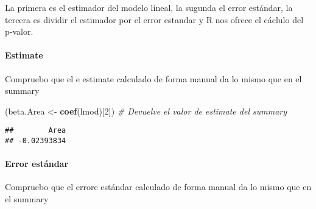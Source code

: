\documentclass[
]{article}
\newenvironment{Shaded}{\begin{snugshade}}{\end{snugshade}}
\newcommand{\CommentTok}[1]{\textcolor[rgb]{0.56,0.35,0.01}{\textit{#1}}}
\newcommand{\DecValTok}[1]{\textcolor[rgb]{0.00,0.00,0.81}{#1}}
\newcommand{\FunctionTok}[1]{\textcolor[rgb]{0.13,0.29,0.53}{\textbf{#1}}}
\newcommand{\NormalTok}[1]{#1}
\newcommand{\OtherTok}[1]{\textcolor[rgb]{0.56,0.35,0.01}{#1}}
\newcommand{\SpecialCharTok}[1]{\textcolor[rgb]{0.81,0.36,0.00}{\textbf{#1}}}
\begin{document}
La primera es el estimador del modelo lineal, la sugunda el error
estándar, la tercera es dividir el estimador por el error estandar y R
nos ofrece el cáclulo del p-valor.

\hypertarget{estimate}{%
\paragraph{Estimate}\label{estimate}}

Compruebo que el e estimate calculado de forma manual da lo mismo que en
el summary

\begin{Shaded}
\begin{Highlighting}[]
\NormalTok{(beta.Area }\OtherTok{\textless{}{-}} \FunctionTok{coef}\NormalTok{(lmod)[}\DecValTok{2}\NormalTok{]) }\CommentTok{\# Devuelve el valor de estimate del summary}
\end{Highlighting}
\end{Shaded}

\begin{verbatim}
##        Area 
## -0.02393834
\end{verbatim}

\hypertarget{error-estuxe1ndar}{%
\paragraph{Error estándar}\label{error-estuxe1ndar}}

Compruebo que el errore estándar calculado de forma manual da lo mismo
que en el summary

\begin{Shaded}
\end{Shaded}
\end{document}
